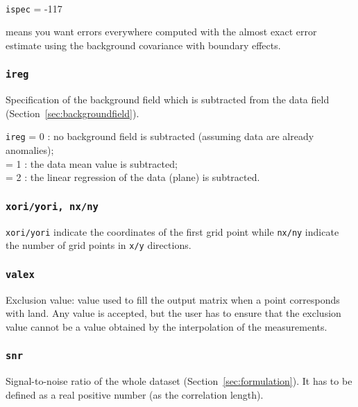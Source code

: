 \example\\
\texttt{ispec}             = -117 \qquad \begin{minipage}[t]{.7\textwidth}{means you want errors everywhere computed with the almost exact error estimate using the background covariance with boundary effects.}\end{minipage}






\subsubsection{\texttt{ireg}}

Specification of the background field which is subtracted from the data field (Section~\ref{sec:backgroundfield}).

\texttt{ireg}             = 0 \qquad: no background field is subtracted (assuming data are already anomalies); \\
  = 1 \qquad: the data mean value is subtracted;\\
  = 2 \qquad: the linear regression of the data (plane) is subtracted.

\subsubsection{\texttt{xori/yori, nx/ny}}

\texttt{xori/yori} indicate the coordinates of the first grid point while \texttt{nx/ny} indicate the number of grid points in \texttt{x/y} directions.



\subsubsection{\texttt{valex}}

Exclusion value: value used to fill the output matrix when a point corresponds with land. Any value is accepted, but the user has to ensure that the exclusion value cannot be a value obtained by the interpolation of the measurements. 


\subsubsection{\texttt{snr}}

Signal-to-noise ratio of the whole dataset (Section~\ref{sec:formulation}). It has to be defined as a real positive number (as the correlation length).

